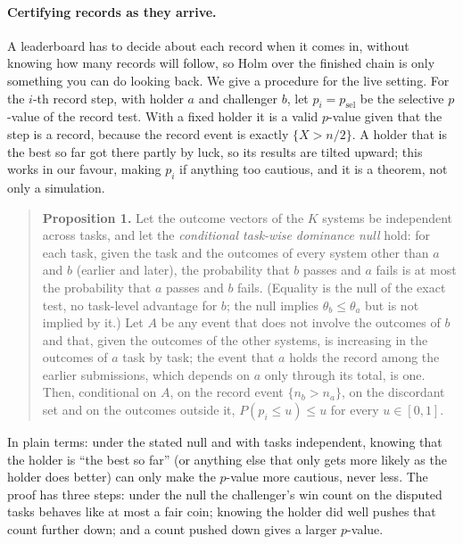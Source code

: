 \documentclass[11pt]{article}
\begin{document}
\paragraph{Certifying records as they arrive.}
A leaderboard has to decide about each record when it comes in, without knowing how many records will follow, so Holm over the finished chain is only something you can do looking back.
We give a procedure for the live setting.
For the $i$-th record step, with holder $a$ and challenger $b$, let $p_i=p_{\mathrm{sel}}$ be the selective $p$-value of the record test.
With a fixed holder it is a valid $p$-value given that the step is a record, because the record event is exactly $\{X>n/2\}$.
A holder that is the best so far got there partly by luck, so its results are tilted upward; this works in our favour, making $p_i$ if anything too cautious, and it is a theorem, not only a simulation.

\begin{quote}
\textbf{Proposition 1.}
Let the outcome vectors of the $K$ systems be independent across tasks, and let the \emph{conditional task-wise dominance null} hold: for each task, given the task and the outcomes of every system other than $a$ and $b$ (earlier and later), the probability that $b$ passes and $a$ fails is at most the probability that $a$ passes and $b$ fails.
(Equality is the null of the exact test, no task-level advantage for $b$; the null implies $\theta_b\le\theta_a$ but is not implied by it.)
Let $A$ be any event that does not involve the outcomes of $b$ and that, given the outcomes of the other systems, is increasing in the outcomes of $a$ task by task; the event that $a$ holds the record among the earlier submissions, which depends on $a$ only through its total, is one.
Then, conditional on $A$, on the record event $\{n_b>n_a\}$, on the discordant set and on the outcomes outside it, $P(p_i\le u)\le u$ for every $u\in[0,1]$.
\end{quote}
In plain terms: under the stated null and with tasks independent, knowing that the holder is ``the best so far'' (or anything else that only gets more likely as the holder does better) can only make the $p$-value more cautious, never less.
The proof has three steps: under the null the challenger's win count on the disputed tasks behaves like at most a fair coin; knowing the holder did well pushes that count further down; and a count pushed down gives a larger $p$-value.
\end{document}
